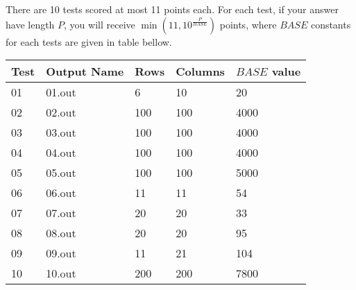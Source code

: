 There are 10 tests scored at most 11 points each. For each test, if your answer have length $P$, you will receive $\min(11, 10^\frac{P}{BASE})$ points, where $BASE$ constants for each tests are given in table bellow. 

\begin{tabular}{|l|l|l|l|l|}
\hline
Test & Output Name & Rows & Columns & $BASE$ value \\ \hline
01 & 01.out & 6 & 10 & 20 \\ \hline
02 & 02.out & 100 & 100 & 4000 \\ \hline
03 & 03.out & 100 & 100 & 4000 \\ \hline
04 & 04.out & 100 & 100 & 4000 \\ \hline
05 & 05.out & 100 & 100 & 5000 \\ \hline
06 & 06.out & 11 & 11 & 54 \\ \hline
07 & 07.out & 20 & 20 & 33 \\ \hline
08 & 08.out & 20 & 20 & 95 \\ \hline
09 & 09.out & 11 & 21 & 104 \\ \hline
10 & 10.out & 200 & 200 & 7800 \\ \hline
\end{tabular}